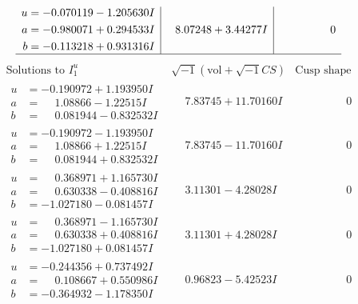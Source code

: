 \documentclass[1p]{elsarticle_modified}
\theoremstyle{definition}
\newcommand{\I}{\sqrt{-1}}
\begin{document}
$$\begin{array}{c|c|c}
\begin{aligned}
u &= -0.070119 - 1.205630 I \\
a &= -0.980071 + 0.294533 I \\
b &= -0.113218 + 0.931316 I\end{aligned}
 & \phantom{-}8.07248 + 3.44277 I & \phantom{-0.000000 } 0\\
 \hline 
 \end{array}$$\newpage$$\begin{array}{c|c|c}  
\text{Solutions to }I^u_{1}& \I (\text{vol} + \sqrt{-1}CS) & \text{Cusp shape}\\
 \hline 
\begin{aligned}
u &= -0.190972 + 1.193950 I \\
a &= \phantom{-}1.08866 - 1.22515 I \\
b &= \phantom{-}0.081944 - 0.832532 I\end{aligned}
 & \phantom{-}7.83745 + 11.70160 I & \phantom{-0.000000 } 0 \\ \hline\begin{aligned}
u &= -0.190972 - 1.193950 I \\
a &= \phantom{-}1.08866 + 1.22515 I \\
b &= \phantom{-}0.081944 + 0.832532 I\end{aligned}
 & \phantom{-}7.83745 - 11.70160 I & \phantom{-0.000000 } 0 \\ \hline\begin{aligned}
u &= \phantom{-}0.368971 + 1.165730 I \\
a &= \phantom{-}0.630338 - 0.408816 I \\
b &= -1.027180 - 0.081457 I\end{aligned}
 & \phantom{-}3.11301 - 4.28028 I & \phantom{-0.000000 } 0 \\ \hline\begin{aligned}
u &= \phantom{-}0.368971 - 1.165730 I \\
a &= \phantom{-}0.630338 + 0.408816 I \\
b &= -1.027180 + 0.081457 I\end{aligned}
 & \phantom{-}3.11301 + 4.28028 I & \phantom{-0.000000 } 0 \\ \hline\begin{aligned}
u &= -0.244356 + 0.737492 I \\
a &= \phantom{-}0.108667 + 0.550986 I \\
b &= -0.364932 - 1.178350 I\end{aligned}
 & \phantom{-}0.96823 - 5.42523 I & \phantom{-0.000000 } 0 \\ \hline\begin{aligned}

\end{aligned}
\end{array}$$
\end{document}
